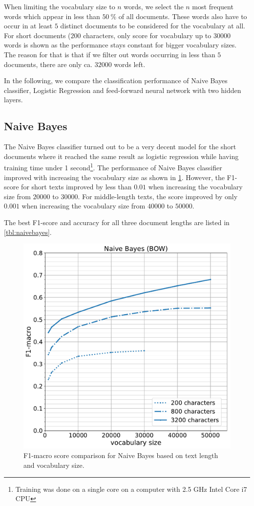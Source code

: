When limiting the vocabulary size to $n$ words, we select the $n$ most frequent words which appear in less than $50\ \%$ of all documents. These words also have to occur in at least $5$ distinct documents to be considered for the vocabulary at all. For short documents ($200$ characters, only score for vocabulary up to $30000$ words is shown as the performance stays constant for bigger vocabulary sizes. The reason for that is that if we filter out words occurring in less than $5$ documents, there are only ca. $32000$ words left.

In the following, we compare the classification performance of Naive Bayes classifier, Logistic Regression and feed-forward neural network with two hidden layers. 

\subsection{Naive Bayes}
The Naive Bayes classifier turned out to be a very decent model for the short documents where it reached the same result as logistic regression while having training time under 1 second\footnote{Training was done on a single core on a computer with 2.5 GHz Intel Core i7 CPU}. The performance of Naive Bayes classifier improved with increasing the vocabulary size as shown in \cref{fig:naivebayes}. However, the F1-score for short texts improved by less than $0.01$ when increasing the vocabulary size from $20000$ to $30000$. For middle-length texts, the score improved by only $0.001$ when increasing the vocabulary size from $40000$ to $50000$. 



The best F1-score and accuracy for all three document lengths are listed in \cref{tbl:naivebayes}.

\begin{figure}[h]
	\centering
	\includegraphics[height=0.3\textheight]{img/05_bow_nb}
	\caption{F1-macro score comparison for Naive Bayes based on text length and vocabulary size.}
	\label{fig:naivebayes}
\end{figure}


